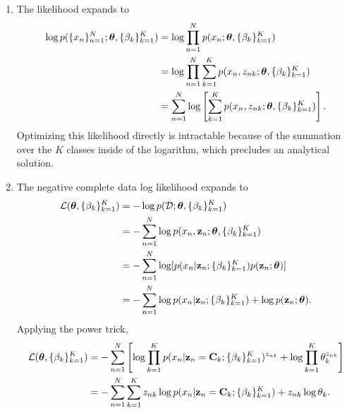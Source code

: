 \documentclass[submit]{harvardml}
\begin{document}
\begin{enumerate}
  \item The likelihood expands to
	\begin{align*}
	 	\log p(\{x_n\}^N_{n=1}; \boldsymbol{\theta}, \{\beta_k\}^K_{k = 1})
	 	&= \log \prod_{n=1}^N p(x_n; \boldsymbol{\theta}, \{\beta_k\}^K_{k = 1}) \\
	 	&= \log \prod_{n=1}^N \sum_{k=1}^K p(x_n, z_{nk}; \boldsymbol{\theta}, \{\beta_k\}^K_{k = 1}) \\
	 	&= \sum_{n=1}^N \log \left[\sum_{k=1}^K p(x_n, z_{nk}; \boldsymbol{\theta}, \{\beta_k\}^K_{k = 1})\right].
	\end{align*}
	Optimizing this likelihood directly is intractable because of the summation over the $K$ classes inside of the logarithm, which precludes an analytical solution.
  
  \item The negative complete data log likelihood expands to
	\begin{align*}
		\mathcal{L}(\boldsymbol{\theta}, \{\beta_k\}^K_{k=1})
		&=  -\log p(\mathcal D; \boldsymbol{\theta}, \{\beta_k\}^K_{k=1}) \\
		&=  -\sum_{n=1}^N \log p(x_n, \mathbf{z}_n; \boldsymbol{\theta}, \{\beta_k\}^K_{k=1}) \\
		&= -\sum_{n=1}^N \log [p(x_n | \mathbf{z}_n; \{\beta_k\}^K_{k=1})p(\mathbf{z}_n; \boldsymbol{\theta})] \\
		&= -\sum_{n=1}^N \log p(x_n | \mathbf{z}_n; \{\beta_k\}^K_{k=1}) + \log p(\mathbf{z}_n; \boldsymbol{\theta}).
	\end{align*}
	Applying the power trick,
		\begin{align*}
		\mathcal{L}(\boldsymbol{\theta}, \{\beta_k\}^K_{k=1})
		&= -\sum_{n=1}^N \left[ \log \prod_{k=1}^K p(x_n|\mathbf{z}_n = \mathbf{C}_k; \{\beta_k\}^K_{k=1})^{z_{nk}} + \log \prod_{k=1}^K \theta_k^{z_{nk}} \right] \\
		&= -\sum_{n=1}^N \sum_{k=1}^K z_{nk} \log p(x_n|\mathbf{z}_n = \mathbf{C}_k; \{\beta_k\}^K_{k=1}) + z_{nk} \log \theta_k.
	\end{align*}
  

\end{enumerate}
\end{document}

